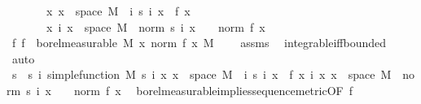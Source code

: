 \begin{isabellebody}
\ \ \ \ \ \ \ {\isachardoublequoteopen}{\isasymAnd}x{\isachardot}{\kern0pt}\ x\ {\isasymin}\ space\ M\ {\isasymLongrightarrow}\ {\isacharparenleft}{\kern0pt}{\isasymlambda}i{\isachardot}{\kern0pt}\ s\ i\ x{\isacharparenright}{\kern0pt}\ {\isasymlonglonglongrightarrow}\ f\ x{\isachardoublequoteclose}\isanewline
\ \ \ \ \ \ \ {\isachardoublequoteopen}{\isasymAnd}x\ i{\isachardot}{\kern0pt}\ x\ {\isasymin}\ space\ M\ {\isasymLongrightarrow}\ norm\ {\isacharparenleft}{\kern0pt}s\ i\ x{\isacharparenright}{\kern0pt}\ {\isasymle}\ {}\ {\isacharasterisk}{\kern0pt}\ norm\ {\isacharparenleft}{\kern0pt}f\ x{\isacharparenright}{\kern0pt}{\isachardoublequoteclose}\isanewline
%
\isadelimproof
%
\endisadelimproof
%
\isatagproof
{}\isamarkupfalse%
{\isacharminus}{\kern0pt}\isanewline
\ \ \isamarkupfalse%
\ f{\isacharcolon}{\kern0pt}\ {\isachardoublequoteopen}f\ {\isasymin}\ borel{\isacharunderscore}{\kern0pt}measurable\ M{\isachardoublequoteclose}\ {\isachardoublequoteopen}{\isacharparenleft}{\kern0pt}{\isasymintegral}\isactrlsup {\isacharplus}{\kern0pt}x{\isachardot}{\kern0pt}\ norm\ {\isacharparenleft}{\kern0pt}f\ x{\isacharparenright}{\kern0pt}\ {\isasympartial}M{\isacharparenright}{\kern0pt}\ {\isacharless}{\kern0pt}\ {\isasyminfinity}{\isachardoublequoteclose}\ \isamarkupfalse%
\ assms\ \isamarkupfalse%
\ integrable{\isacharunderscore}{\kern0pt}iff{\isacharunderscore}{\kern0pt}bounded\ \isamarkupfalse%
\ auto\isanewline
\ \ \isamarkupfalse%
\ s\ \ s{\isacharcolon}{\kern0pt}\ {\isachardoublequoteopen}{\isasymAnd}i{\isachardot}{\kern0pt}\ simple{\isacharunderscore}{\kern0pt}function\ M\ {\isacharparenleft}{\kern0pt}s\ i{\isacharparenright}{\kern0pt}{\isachardoublequoteclose}\ {\isachardoublequoteopen}{\isasymAnd}x{\isachardot}{\kern0pt}\ x\ {\isasymin}\ space\ M\ {\isasymLongrightarrow}\ {\isacharparenleft}{\kern0pt}{\isasymlambda}i{\isachardot}{\kern0pt}\ s\ i\ x{\isacharparenright}{\kern0pt}\ {\isasymlonglonglongrightarrow}\ f\ x{\isachardoublequoteclose}\ {\isachardoublequoteopen}{\isasymAnd}i\ x{\isachardot}{\kern0pt}\ x\ {\isasymin}\ space\ M\ {\isasymLongrightarrow}\ norm\ {\isacharparenleft}{\kern0pt}s\ i\ x{\isacharparenright}{\kern0pt}\ {\isasymle}\ {}\ {\isacharasterisk}{\kern0pt}\ norm\ {\isacharparenleft}{\kern0pt}f\ x{\isacharparenright}{\kern0pt}{\isachardoublequoteclose}\ \isamarkupfalse%
\ borel{\isacharunderscore}{\kern0pt}measurable{\isacharunderscore}{\kern0pt}implies{\isacharunderscore}{\kern0pt}sequence{\isacharunderscore}{\kern0pt}metric{\isacharbrackleft}{\kern0pt}OF\ f{\isacharparenleft}{\kern0pt}{}{\isacharparenright}{\kern0pt}{\isacharbrackright}{\kern0pt}\ \isamarkupfalse%

\end{isabellebody}

